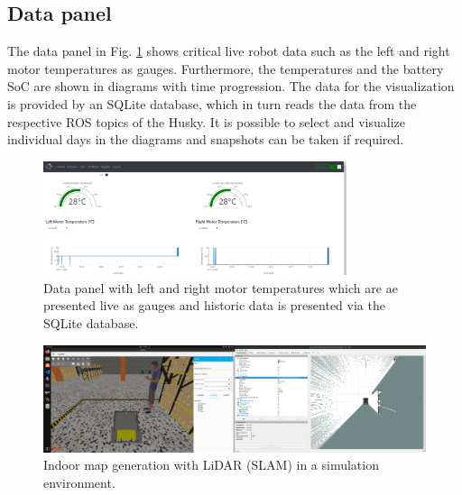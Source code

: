 \documentclass[letterpaper, 10 pt, conference]{ieeeconf}  %
\begin{document}
\subsection{Data panel}
The data panel in Fig. \ref{fig:overviewplots} shows critical live robot data such as the left and right motor temperatures as gauges. 
Furthermore, the temperatures and the battery SoC are shown in diagrams with time progression. 
The data for the visualization is provided by an SQLite database, which in turn reads the data from the respective ROS topics of the Husky. 
It is possible to select and visualize individual days in the diagrams and snapshots can be taken if required.
\begin{figure}[t]
    \centerline{\includegraphics[width=8.9cm]{images/overviewplots.png}}
    \caption{Data panel with left and right motor temperatures which are ae presented live as gauges and historic data is presented via the SQLite database.}
    \label{fig:overviewplots}
\end{figure}
\begin{figure}[htbp]
    \centerline{\includegraphics[width=16.35cm]{images/sim_husky_mapping.png}}
    \caption{Indoor map generation with LiDAR (SLAM) in a simulation environment.}
    \label{fig:huskymapping}
\end{figure}
\end{document}
